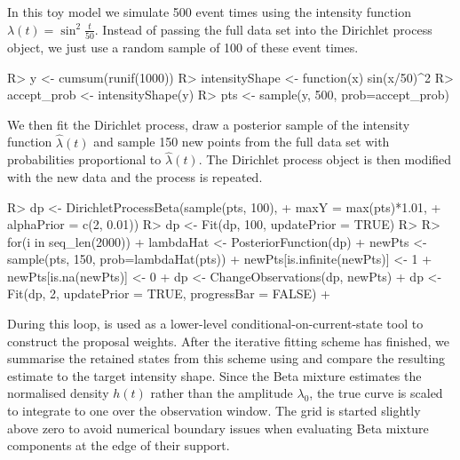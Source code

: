 \documentclass[nojss]{jss}
\begin{document}
In this toy model we simulate 500 event times using the intensity function $\lambda (t) = \sin ^2 \frac{t}{50}$. Instead of passing the full data set into the Dirichlet process object, we just use a random sample of 100 of these event times.

\begin{CodeInput}
R> y <- cumsum(runif(1000))
R> intensityShape <- function(x) sin(x/50)^2
R> accept_prob <- intensityShape(y)
R> pts <- sample(y, 500, prob=accept_prob)
\end{CodeInput}
We then fit the Dirichlet process, draw a posterior sample of the intensity function $\hat{\lambda} (t)$ and sample 150 new points from the full data set with probabilities proportional to $\hat{\lambda} (t)$. The Dirichlet process object is then modified with the new data and the process is repeated.

\begin{CodeInput}
R> dp <- DirichletProcessBeta(sample(pts, 100),
+                        maxY = max(pts)*1.01,
+                        alphaPrior = c(2, 0.01))
R> dp <- Fit(dp, 100, updatePrior = TRUE)
R>
R> for(i in seq_len(2000)){
+   lambdaHat <- PosteriorFunction(dp)
+   newPts <- sample(pts, 150, prob=lambdaHat(pts))
+   newPts[is.infinite(newPts)] <- 1
+   newPts[is.na(newPts)] <- 0
+   dp <- ChangeObservations(dp, newPts)
+   dp <- Fit(dp, 2, updatePrior = TRUE, progressBar = FALSE)
+ }
\end{CodeInput}
During this loop,  is used as a lower-level conditional-on-current-state tool to construct the proposal weights. After the iterative fitting scheme has finished, we summarise the retained states from this scheme using  and compare the resulting estimate to the target intensity shape. Since the Beta mixture estimates the normalised density $h(t)$ rather than the amplitude $\lambda_0$, the true curve is scaled to integrate to one over the observation window. The grid is started slightly above zero to avoid numerical boundary issues when evaluating Beta mixture components at the edge of their support.
\end{document}
